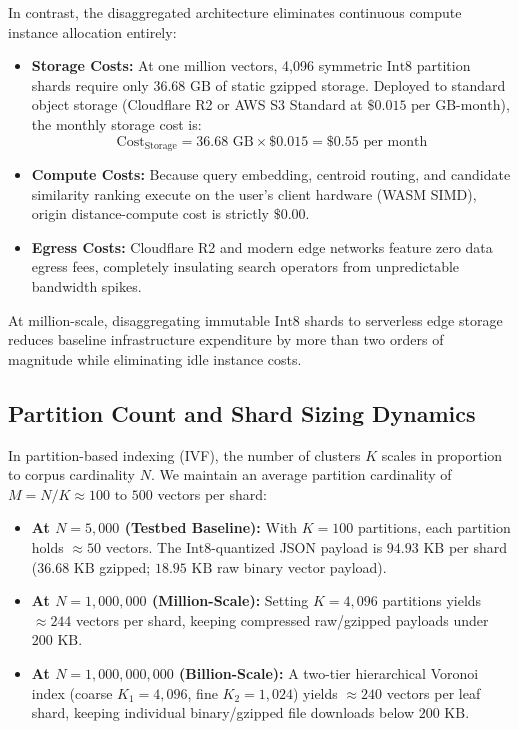 \documentclass[11pt,journal,compsoc,onecolumn]{IEEEtran}
\begin{document}
In contrast, the disaggregated architecture eliminates continuous compute instance allocation entirely:
\begin{itemize}
    \item \textbf{Storage Costs:} At one million vectors, 4,096 symmetric $\text{Int8}$ partition shards require only $36.68\text{ GB}$ of static gzipped storage. Deployed to standard object storage (Cloudflare R2 or AWS S3 Standard at $\$0.015\text{ per GB-month}$), the monthly storage cost is:
    \begin{equation}
        \text{Cost}_{\text{Storage}} = 36.68\text{ GB} \times \$0.015 = \$0.55\text{ per month}
    \end{equation}
    \item \textbf{Compute Costs:} Because query embedding, centroid routing, and candidate similarity ranking execute on the user's client hardware (WASM SIMD), origin distance-compute cost is strictly $\$0.00$.
    \item \textbf{Egress Costs:} Cloudflare R2 and modern edge networks feature zero data egress fees, completely insulating search operators from unpredictable bandwidth spikes.
\end{itemize}
At million-scale, disaggregating immutable $\text{Int8}$ shards to serverless edge storage reduces baseline infrastructure expenditure by more than two orders of magnitude while eliminating idle instance costs.

\subsection{Partition Count and Shard Sizing Dynamics}
In partition-based indexing (IVF), the number of clusters $K$ scales in proportion to corpus cardinality $N$. We maintain an average partition cardinality of $M = N/K \approx 100\text{ to }500$ vectors per shard:
\begin{itemize}
    \item \textbf{At $N = 5,000$ (Testbed Baseline):} With $K = 100$ partitions, each partition holds $\approx 50$ vectors. The $\text{Int8}$-quantized JSON payload is $94.93\text{ KB}$ per shard ($36.68\text{ KB}$ gzipped; $18.95\text{ KB}$ raw binary vector payload).
    \item \textbf{At $N = 1,000,000$ (Million-Scale):} Setting $K = 4,096$ partitions yields $\approx 244$ vectors per shard, keeping compressed raw/gzipped payloads under $200\text{ KB}$.
    \item \textbf{At $N = 1,000,000,000$ (Billion-Scale):} A two-tier hierarchical Voronoi index (coarse $K_1 = 4,096$, fine $K_2 = 1,024$) yields $\approx 240$ vectors per leaf shard, keeping individual binary/gzipped file downloads below $200\text{ KB}$.
\end{itemize}
\end{document}
